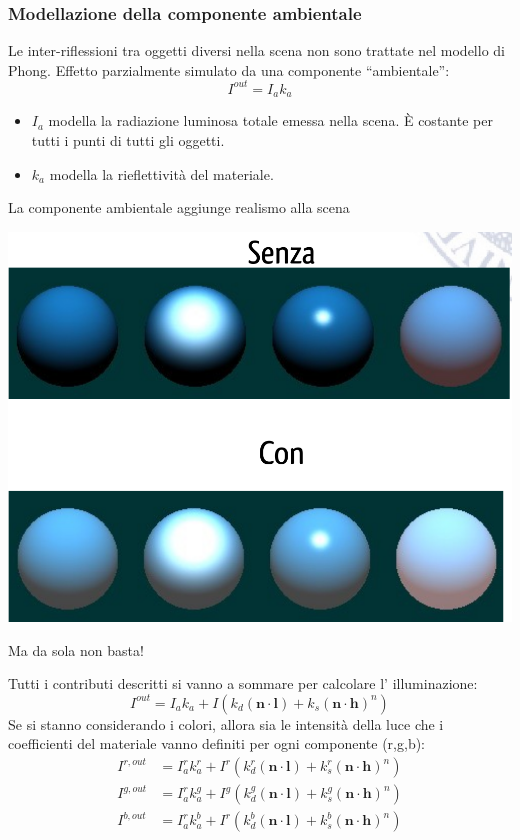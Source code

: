 \documentclass[a4paper, 10pt]{article}
\renewcommand{\vec}{\bm}
\begin{document}
			
		\subsubsection{Modellazione della componente ambientale}
			Le inter-riflessioni tra oggetti diversi nella scena non sono
			trattate nel modello di Phong. 
			Effetto parzialmente simulato da una componente “ambientale”:
			\[
				I^{out} = I_a k_a
			\]
			\begin{itemize}
				\item $ I_a $ modella la radiazione luminosa totale emessa nella scena. È costante per tutti i punti di tutti gli oggetti.
				\item $ k_a $ modella la rieflettività del materiale.
			\end{itemize}
			La componente ambientale aggiunge realismo alla scena
			
			\begin{center}
				\includegraphics[scale=0.2]{ambientale}
			\end{center}
			Ma da sola non basta!
			
			\bigskip
			
			Tutti i contributi descritti si vanno a sommare per calcolare l’
			illuminazione:
			\[
				I^{out} = I_a k_a + I(k_d(\vec{n}\cdot\vec{l}) + k_s(\vec{n}\cdot\vec{h})^n)
			\]
			Se si stanno considerando i colori, allora sia le intensità della
			luce che i coefficienti del materiale vanno definiti per ogni
			componente (r,g,b):
			\begin{align*}
				I^{r,out} &= I_a^r k_a^r + I^r(k_d^r(\vec{n}\cdot\vec{l}) + k_s^r(\vec{n}\cdot\vec{h})^n) \\
				I^{g,out} &= I_a^r k_a^g + I^g(k_d^g(\vec{n}\cdot\vec{l}) + k_s^g(\vec{n}\cdot\vec{h})^n) \\
				I^{b,out} &= I_a^r k_a^b + I^r(k_d^b(\vec{n}\cdot\vec{l}) + k_s^b(\vec{n}\cdot\vec{h})^n)
			\end{align*}
			
\end{document}
